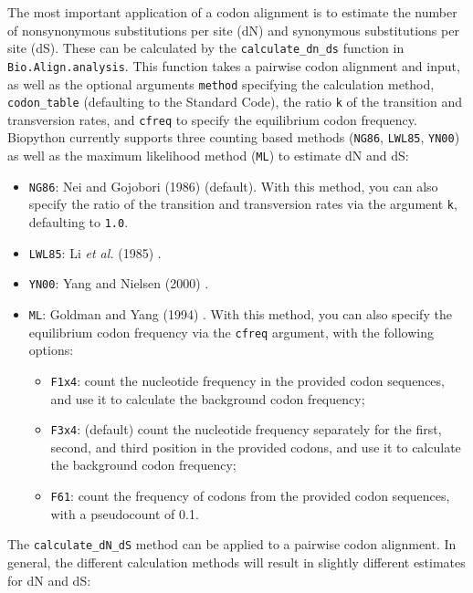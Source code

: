 The most important application of a codon alignment is to estimate the number of nonsynonymous substitutions per site (dN) and synonymous substitutions per site (dS). These can be calculated by the \verb+calculate_dn_ds+ function in \verb+Bio.Align.analysis+. This function takes a pairwise codon alignment and input, as well as the optional arguments \verb+method+ specifying the calculation method, \verb+codon_table+ (defaulting to the Standard Code), the ratio \verb+k+ of the transition and transversion rates, and \verb+cfreq+ to specify the equilibrium codon frequency.  Biopython currently supports three counting based methods (\verb+NG86+, \verb+LWL85+, \verb+YN00+) as well as the maximum likelihood method (\verb+ML+) to estimate dN and dS:
\begin{itemize}
\item \verb+NG86+: Nei and Gojobori (1986) \cite{nei1986} (default). With this method, you can also specify the ratio of the transition and transversion rates via the argument \verb+k+, defaulting to \verb+1.0+.
\item \verb+LWL85+: Li \textit{et al.} (1985) \cite{li1985}.
\item \verb+YN00+: Yang and Nielsen (2000) \cite{yang2000}.
\item \verb+ML+: Goldman and Yang (1994) \cite{goldman1994}. With this method, you can also specify the equilibrium codon frequency via the \verb+cfreq+ argument, with the following options:
\begin{itemize}
\item \verb+F1x4+: count the nucleotide frequency in the provided codon sequences, and use it to calculate the background codon frequency;
\item \verb+F3x4+: (default) count the nucleotide frequency separately for the first, second, and third position in the provided codons, and use it to calculate the background codon frequency;
\item \verb+F61+: count the frequency of codons from the provided codon sequences, with a pseudocount of 0.1.
\end{itemize}
\end{itemize}
The \verb+calculate_dN_dS+ method can be applied to a pairwise codon alignment. In general, the different calculation methods will result in slightly different estimates for dN and dS:

